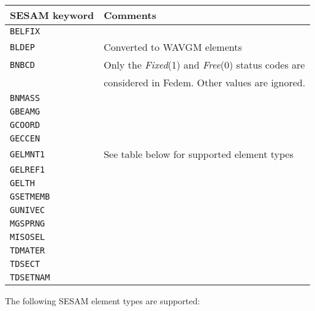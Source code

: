 \medskip
\begin{tabular}{| m{} | m{} |}
  \hline
  \rowcolor[HTML]{EFEFEF} SESAM keyword  &  Comments  \\
  \hline\hline
  {\tt BELFIX}   & \\\hline
  {\tt BLDEP}    & Converted to WAVGM elements \\\hline
  {\tt BNBCD }   & Only the {\sl Fixed}(1) and {\sl Free}(0) status codes are \\
                 & considered in Fedem. Other values are ignored. \\\hline
  {\tt BNMASS}   & \\\hline
  {\tt GBEAMG}   & \\\hline
  {\tt GCOORD}   & \\\hline
  {\tt GECCEN}   & \\\hline
  {\tt GELMNT1}  & See table below for supported element types \\\hline
  {\tt GELREF1}  & \\\hline
  {\tt GELTH}    & \\\hline
  {\tt GSETMEMB} & \\\hline
  {\tt GUNIVEC}  & \\\hline
  {\tt MGSPRNG}  & \\\hline
  {\tt MISOSEL}  & \\\hline
  {\tt TDMATER}  & \\\hline
  {\tt TDSECT}   & \\\hline
  {\tt TDSETNAM} & \\\hline
\end{tabular}

\clearpage

The following SESAM element types are supported:

